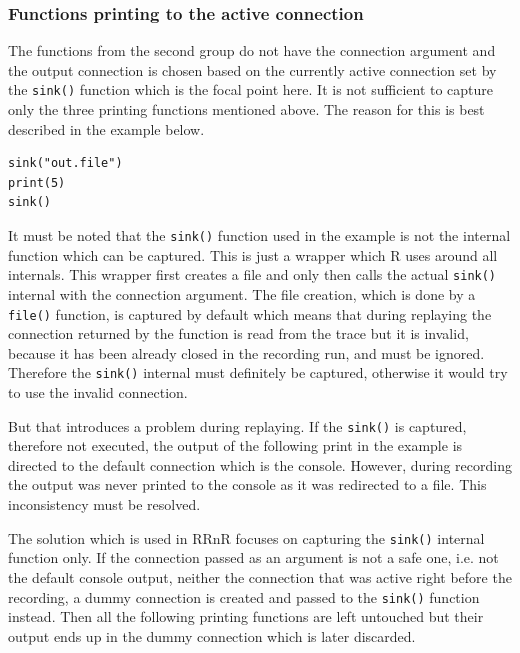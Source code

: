\documentclass[thesis=M,english,hidelinks]{FITthesis}[2012/10/20]
\begin{document}
			\subsubsection{Functions printing to the active connection}
			The functions from the second group do not have the connection argument and the output connection is chosen based on the currently active connection set by the \lstinline|sink()| function which is the focal point here. It is not sufficient to capture only the three printing functions mentioned above. The reason for this is best described in the example below.\par
		
\begin{lstlisting}[style=filestyle, caption={Unwanted printing behaviour example}]
sink("out.file")
print(5)
sink()
\end{lstlisting}
		
			It must be noted that the \lstinline|sink()| function used in the example is not the internal function which can be captured. This is just a wrapper which R uses around all internals. This wrapper first creates a file and only then calls the actual \lstinline|sink()| internal with the connection argument. The file creation, which is done by a \lstinline|file()| function, is captured by default which means that during replaying the connection returned by the function is read from the trace but it is invalid, because it has been already closed in the recording run, and must be ignored. Therefore the \lstinline|sink()| internal must definitely be captured, otherwise it would try to use the invalid connection.\par
			
			But that introduces a problem during replaying. If the \lstinline|sink()| is captured, therefore not executed, the output of the following print in the example is directed to the default connection which is the console. However, during recording the output was never printed to the console as it was redirected to a file. This inconsistency must be resolved.\par
			
			The solution which is used in RRnR focuses on capturing the \lstinline|sink()| internal function only. If the connection passed as an argument is not a safe one, i.e. not the default console output, neither the connection that was active right before the recording, a dummy connection is created and passed to the \lstinline|sink()| function instead. Then all the following printing functions are left untouched but their output ends up in the dummy connection which is later discarded.\par
			
\end{document}

